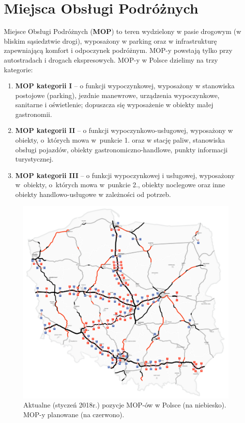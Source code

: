 \section{Miejsca Obsługi Podróżnych}
Miejsce Obsługi Podróżnych (\textbf{MOP}) to teren wydzielony w pasie drogowym (w bliskim sąsiedztwie drogi), wyposażony w parking oraz w infrastrukturę zapewniającą komfort i odpoczynek podróżnym\cite{gddkia-mop}. MOP-y powstają tylko przy autostradach i drogach ekspresowych.\newline
MOP-y w Polsce dzielimy na trzy kategorie:
\begin{enumerate}
    \item \textbf{MOP kategorii I} -- o funkcji wypoczynkowej, wyposażony w stanowiska postojowe (parking), jezdnie manewrowe, urządzenia wypoczynkowe, sanitarne i oświetlenie; dopuszcza się wyposażenie w obiekty małej gastronomii.
    \item \textbf{MOP kategorii II} -- o funkcji wypoczynkowo-usługowej, wyposażony w obiekty, o~których mowa w~punkcie 1. oraz w stację paliw, stanowiska obsługi pojazdów, obiekty gastronomiczno-handlowe, punkty informacji turystycznej.
    \item \textbf{MOP kategorii III} -- o funkcji wypoczynkowej i usługowej, wyposażony w~obiekty, o~których mowa w~punkcie 2., obiekty noclegowe oraz inne obiekty handlowo-usługowe w zależności od potrzeb.
\end{enumerate}
\begin{figure}[h]
\caption{Aktualne (styczeń 2018r.) pozycje MOP-ów w Polsce (na niebiesko). MOP-y planowane (na czerwono).}
\includegraphics[width=\textwidth]{images/mopymap.png}
\end{figure}


